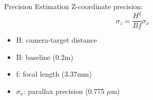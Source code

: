 \documentclass[aspectratio=43]{beamer}
\begin{document}
\begin{frame}
\begin{columns}
\begin{column}{0.5\textwidth}
            \begin{exampleblock}{Precision Estimation}
                \scriptsize
                Z-coordinate precision:
                $$\sigma_z = \frac{H^2}{Bf} \sigma_x$$
                \begin{itemize}
                    \item H: camera-target distance
                    \item B: baseline (0.2m)
                    \item f: focal length (3.37mm)
                    \item $\sigma_x$: parallax precision (0.775 \ensuremath{\mu}m)
                \end{itemize}
            \end{exampleblock}
        \end{column}
    \end{columns}
\end{frame}
\end{document}
